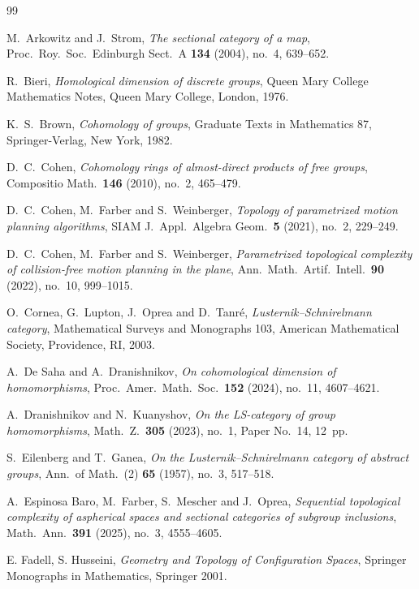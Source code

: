 \documentclass[11pt]{amsart}
\theoremstyle{plain}
\theoremstyle{definition}
\begin{document}
\begin{thebibliography}{99}

M.~Arkowitz and J.~Strom, \emph{The sectional category of a map},
Proc.\ Roy.\ Soc.\ Edinburgh Sect.\ A \textbf{134} (2004), no.~4, 639--652.

R.~Bieri, \emph{Homological dimension of discrete groups},
Queen Mary College Mathematics Notes, Queen Mary College, London, 1976.

K.~S.~Brown, \emph{Cohomology of groups},
Graduate Texts in Mathematics 87, Springer-Verlag, New York, 1982.

D.~C.~Cohen, \emph{Cohomology rings of almost-direct products of free groups},
Compositio Math.\ \textbf{146} (2010), no.~2, 465--479.

D.~C.~Cohen, M.~Farber and S.~Weinberger,
\emph{Topology of parametrized motion planning algorithms},
SIAM J.\ Appl.\ Algebra Geom.\ \textbf{5} (2021), no.~2, 229--249.

D.~C.~Cohen, M.~Farber and S.~Weinberger,
\emph{Parametrized topological complexity of collision-free motion planning
in the plane},
Ann.\ Math.\ Artif.\ Intell.\ \textbf{90} (2022), no.~10, 999--1015.

O.~Cornea, G.~Lupton, J.~Oprea and D.~Tanr\'e,
\emph{Lusternik--Schnirelmann category},
Mathematical Surveys and Monographs 103,
American Mathematical Society, Providence, RI, 2003.

A.~De Saha and A.~Dranishnikov,
\emph{On cohomological dimension of homomorphisms},
Proc.\ Amer.\ Math.\ Soc.\ \textbf{152} (2024), no.~11, 4607--4621.

A.~Dranishnikov and N.~Kuanyshov,
\emph{On the LS-category of group homomorphisms},
Math.\ Z.\ \textbf{305} (2023), no.~1, Paper No.~14, 12~pp.

S.~Eilenberg and T.~Ganea,
\emph{On the Lusternik--Schnirelmann category of abstract groups},
Ann.\ of Math.\ (2) \textbf{65} (1957), no.~3, 517--518.

A.~Espinosa Baro, M.~Farber, S.~Mescher and J.~Oprea,
\emph{Sequential topological complexity of aspherical spaces and sectional
categories of subgroup inclusions},
Math.\ Ann.\ \textbf{391} (2025), no.~3, 4555--4605.

E. Fadell, S. Husseini, \emph{Geometry and Topology of Configuration Spaces}, 
Springer Monographs in Mathematics, Springer 2001.


\end{thebibliography}
\end{document}

